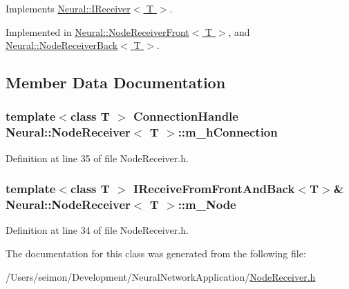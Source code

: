 Implements \hyperlink{class_neural_1_1_i_receiver_aa05f65f454efc76604a5e2c5644720fc}{Neural::IReceiver$<$ T $>$}.



Implemented in \hyperlink{class_neural_1_1_node_receiver_front_a7d9e947a159607ad16b98c0a57c2c7cf}{Neural::NodeReceiverFront$<$ T $>$}, and \hyperlink{class_neural_1_1_node_receiver_back_add5216320f1d7f70b328f4ba298d0707}{Neural::NodeReceiverBack$<$ T $>$}.



\subsection{Member Data Documentation}
\hypertarget{class_neural_1_1_node_receiver_ad02dfaa1d4d9ba2e2bdef03a4b310282}{
\subsubsection[{m\_\-hConnection}]{\setlength{\rightskip}{0pt plus 5cm}template$<$class T $>$ {\bf ConnectionHandle} {\bf Neural::NodeReceiver}$<$ T $>$::{\bf m\_\-hConnection}}}
\label{class_neural_1_1_node_receiver_ad02dfaa1d4d9ba2e2bdef03a4b310282}


Definition at line 35 of file NodeReceiver.h.

\hypertarget{class_neural_1_1_node_receiver_aca3afc7c5d6c1b378a95f24a42926586}{
\subsubsection[{m\_\-Node}]{\setlength{\rightskip}{0pt plus 5cm}template$<$class T $>$ {\bf IReceiveFromFrontAndBack}$<$T$>$\& {\bf Neural::NodeReceiver}$<$ T $>$::{\bf m\_\-Node}}}
\label{class_neural_1_1_node_receiver_aca3afc7c5d6c1b378a95f24a42926586}


Definition at line 34 of file NodeReceiver.h.



The documentation for this class was generated from the following file:\begin{DoxyCompactItemize}
\item 
/Users/seimon/Development/NeuralNetworkApplication/\hyperlink{_node_receiver_8h}{NodeReceiver.h}\end{DoxyCompactItemize}
